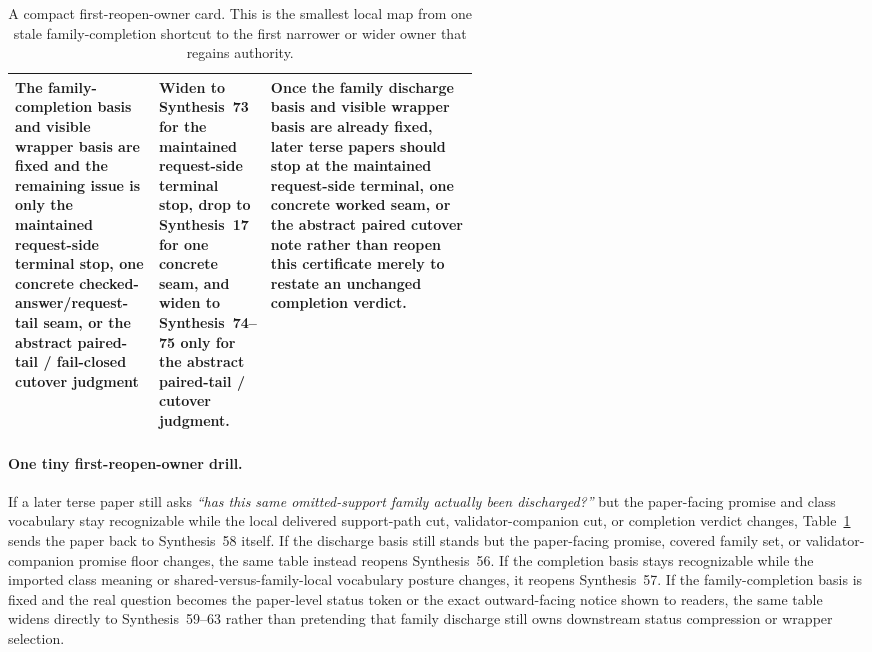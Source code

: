 \documentclass[11pt]{article}
\begin{document}
\begin{table}[t]
\begin{tabularx}{\linewidth}{@{}p{0.31\linewidth}p{0.23\linewidth}X@{}}
The family-completion basis and visible wrapper basis are fixed and the remaining issue is only the maintained request-side terminal stop, one concrete checked-answer/request-tail seam, or the abstract paired-tail / fail-closed cutover judgment & Widen to Synthesis~73 for the maintained request-side terminal stop, drop to Synthesis~17 for one concrete seam, and widen to Synthesis~74--75 only for the abstract paired-tail / cutover judgment. & Once the family discharge basis and visible wrapper basis are already fixed, later terse papers should stop at the maintained request-side terminal, one concrete worked seam, or the abstract paired cutover note rather than reopen this certificate merely to restate an unchanged completion verdict. \\
\bottomrule
\end{tabularx}
\caption{A compact first-reopen-owner card. This is the smallest local map from one stale family-completion shortcut to the first narrower or wider owner that regains authority.}
\label{tab:first-reopen-owner-card-request-fulfillment}
\end{table}

\paragraph{One tiny first-reopen-owner drill.}
If a later terse paper still asks \emph{``has this same omitted-support family actually been discharged?''} but the paper-facing promise and class vocabulary stay recognizable while the local delivered support-path cut, validator-companion cut, or completion verdict changes, Table~\ref{tab:first-reopen-owner-card-request-fulfillment} sends the paper back to Synthesis~58 itself. If the discharge basis still stands but the paper-facing promise, covered family set, or validator-companion promise floor changes, the same table instead reopens Synthesis~56. If the completion basis stays recognizable while the imported class meaning or shared-versus-family-local vocabulary posture changes, it reopens Synthesis~57. If the family-completion basis is fixed and the real question becomes the paper-level status token or the exact outward-facing notice shown to readers, the same table widens directly to Synthesis~59--63 rather than pretending that family discharge still owns downstream status compression or wrapper selection.\cite{series:workedexample,series:publicrequeststatusenvelopes,series:publicrequestcarryforward,series:publicrequestnotices,series:publicrequestnoticenormalforms,series:publicrequestnoticeselections,series:requestsideterminalcitationnormalform,series:pairedterminalcitationdiscipline,series:pairedterminalcutoverrules}
\end{document}
